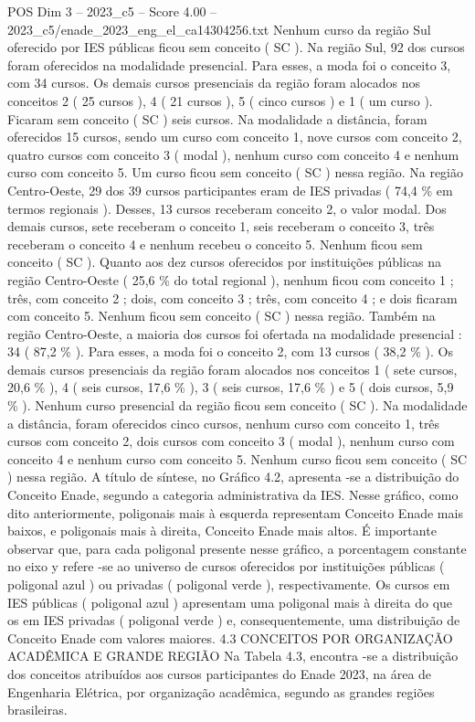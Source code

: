 \begin{textsample}{POS Dim 3 – 2023\_c5 – Score 4.00 – 2023\_c5/enade\_2023\_eng\_el\_ca14304256.txt}
Nenhum curso da região Sul oferecido por IES públicas ficou sem conceito ( SC ).
Na região Sul, 92 dos cursos foram oferecidos na modalidade presencial.
Para esses, a moda foi o conceito 3, com 34 cursos.
Os demais cursos presenciais da região foram alocados nos conceitos 2 ( 25 cursos ), 4 ( 21 cursos ), 5 ( cinco cursos ) e 1 ( um curso ).
Ficaram sem conceito ( SC ) seis cursos.
Na modalidade a distância, foram oferecidos 15 cursos, sendo um curso com conceito 1, nove cursos com conceito 2, quatro cursos com conceito 3 ( modal ), nenhum curso com conceito 4 e nenhum curso com conceito 5.
Um curso ficou sem conceito ( SC ) nessa região.
Na região Centro-Oeste, 29 dos 39 cursos participantes eram de IES privadas ( 74,4 \% em termos regionais ).
Desses, 13 cursos receberam conceito 2, o valor modal.
Dos demais cursos, sete receberam o conceito 1, seis receberam o conceito 3, três receberam o conceito 4 e nenhum recebeu o conceito 5.
Nenhum ficou sem conceito ( SC ).
Quanto aos dez cursos oferecidos por instituições públicas na região Centro-Oeste ( 25,6 \% do total regional ), nenhum ficou com conceito 1 ; três, com conceito 2 ; dois, com conceito 3 ; três, com conceito 4 ; e dois ficaram com conceito 5.
Nenhum ficou sem conceito ( SC ) nessa região.
Também na região Centro-Oeste, a maioria dos cursos foi ofertada na modalidade presencial : 34 ( 87,2 \% ).
Para esses, a moda foi o conceito 2, com 13 cursos ( 38,2 \% ).
Os demais cursos presenciais da região foram alocados nos conceitos 1 ( sete cursos, 20,6 \% ), 4 ( seis cursos, 17,6 \% ), 3 ( seis cursos, 17,6 \% ) e 5 ( dois cursos, 5,9 \% ).
Nenhum curso presencial da região ficou sem conceito ( SC ).
Na modalidade a distância, foram oferecidos cinco cursos, nenhum curso com conceito 1, três cursos com conceito 2, dois cursos com conceito 3 ( modal ), nenhum curso com conceito 4 e nenhum curso com conceito 5.
Nenhum curso ficou sem conceito ( SC ) nessa região.
A título de síntese, no Gráfico 4.2, apresenta -se a distribuição do Conceito Enade, segundo a categoria administrativa da IES.
Nesse gráfico, como dito anteriormente, poligonais mais à esquerda representam Conceito Enade mais baixos, e poligonais mais à direita, Conceito Enade mais altos.
É importante observar que, para cada poligonal presente nesse gráfico, a porcentagem constante no eixo y refere -se ao universo de cursos oferecidos por instituições públicas ( poligonal azul ) ou privadas ( poligonal verde ), respectivamente.
Os cursos em IES públicas ( poligonal azul ) apresentam uma poligonal mais à direita do que os em IES privadas ( poligonal verde ) e, consequentemente, uma distribuição de Conceito Enade com valores maiores. 4.3 CONCEITOS POR ORGANIZAÇÃO ACADÊMICA E GRANDE REGIÃO Na Tabela 4.3, encontra -se a distribuição dos conceitos atribuídos aos cursos participantes do Enade 2023, na área de Engenharia Elétrica, por organização acadêmica, segundo as grandes regiões brasileiras.

\end{textsample}
